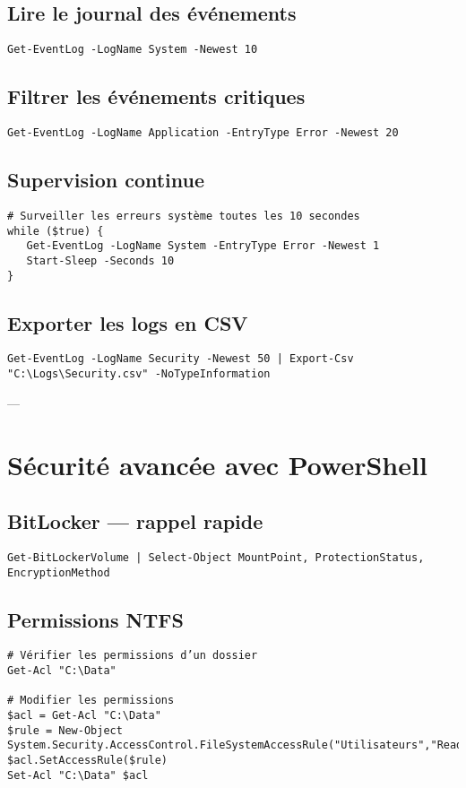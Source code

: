 \documentclass[a4paper,12pt]{article}
\begin{document}
\subsection{Lire le journal des événements}
\begin{verbatim}
Get-EventLog -LogName System -Newest 10
\end{verbatim}

\subsection{Filtrer les événements critiques}
\begin{verbatim}
Get-EventLog -LogName Application -EntryType Error -Newest 20
\end{verbatim}

\subsection{Supervision continue}
\begin{verbatim}
# Surveiller les erreurs système toutes les 10 secondes
while ($true) {
   Get-EventLog -LogName System -EntryType Error -Newest 1
   Start-Sleep -Seconds 10
}
\end{verbatim}

\subsection{Exporter les logs en CSV}
\begin{verbatim}
Get-EventLog -LogName Security -Newest 50 | Export-Csv "C:\Logs\Security.csv" -NoTypeInformation
\end{verbatim}

---

\section{Sécurité avancée avec PowerShell}
\subsection{BitLocker — rappel rapide}
\begin{verbatim}
Get-BitLockerVolume | Select-Object MountPoint, ProtectionStatus, EncryptionMethod
\end{verbatim}

\subsection{Permissions NTFS}
\begin{verbatim}
# Vérifier les permissions d’un dossier
Get-Acl "C:\Data"

# Modifier les permissions
$acl = Get-Acl "C:\Data"
$rule = New-Object System.Security.AccessControl.FileSystemAccessRule("Utilisateurs","ReadAndExecute","Allow")
$acl.SetAccessRule($rule)
Set-Acl "C:\Data" $acl
\end{verbatim}
\end{document}
